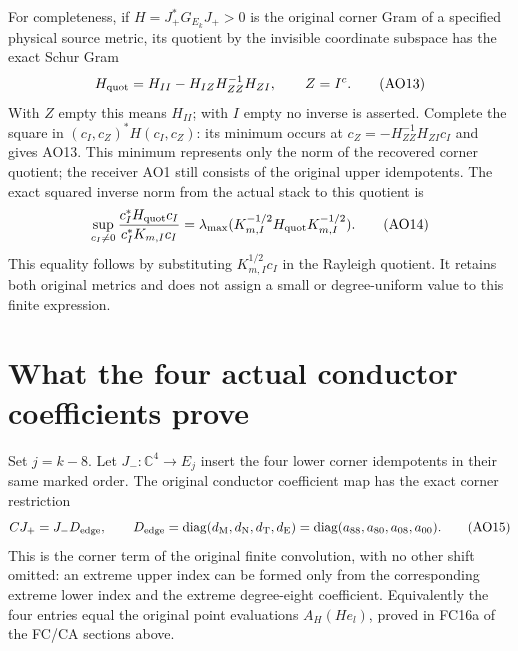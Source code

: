 \documentclass[11pt]{article}
\newcommand{\C}{\mathbb C}
\newcommand{\diag}{\operatorname{diag}}
\begin{document}
For completeness, if $H=J_+^*G_{E_k}J_+>0$ is the original
corner Gram of a specified physical source metric, its quotient
by the invisible coordinate subspace has the exact Schur Gram
\begin{equation}
 H_{\rm quot}=H_{II}-H_{IZ}H_{ZZ}^{-1}H_{ZI},
 \qquad Z=I^c.
 \tag{AO13}
\end{equation}
With $Z$ empty this means $H_{II}$; with $I$ empty no inverse
is asserted. Complete the square in
$(c_I,c_Z)^*H(c_I,c_Z)$: its minimum occurs at
$c_Z=-H_{ZZ}^{-1}H_{ZI}c_I$ and gives AO13. This minimum
represents only the norm of the recovered corner quotient;
the receiver AO1 still consists of the original upper
idempotents. The exact squared inverse norm from the actual
stack to this quotient is
\begin{equation}
 \sup_{c_I\ne0}\frac{c_I^*H_{\rm quot}c_I}
                         {c_I^*K_{m,I}c_I}
 =\lambda_{\max}
     (K_{m,I}^{-1/2}H_{\rm quot}K_{m,I}^{-1/2}).\tag{AO14}
\end{equation}
This equality follows by substituting $K_{m,I}^{1/2}c_I$ in
the Rayleigh quotient. It retains both original metrics and
does not assign a small or degree-uniform value to this
finite expression.

\section{What the four actual conductor coefficients prove}
Set $j=k-8$. Let $J_-:\C^4\to E_j$ insert the four lower
corner idempotents in their same marked order. The original
conductor coefficient map has the exact corner restriction
\begin{equation}
 C J_+=J_-D_{\rm edge},\qquad
 D_{\rm edge}=\diag(d_{\mathrm M},d_{\mathrm N},d_{\mathrm T},d_{\mathrm E})
      =\diag(a_{88},a_{80},a_{08},a_{00}).\tag{AO15}
\end{equation}
This is the corner term of the original finite convolution,
with no other shift omitted: an extreme upper index can be
formed only from the corresponding extreme lower index
and the extreme degree-eight coefficient. Equivalently the
four entries equal the original point evaluations
$A_H(He_l)$, proved in FC16a of the FC/CA sections above.
\end{document}

